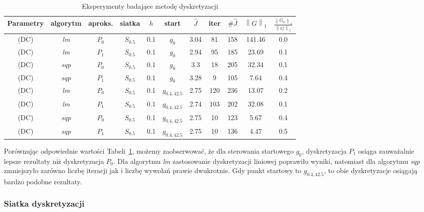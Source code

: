\documentclass[11pt]{article}
\newcommand{\norm}[1]{\left\lVert#1\right\rVert}
\begin{document}
\begin{table}[h!]
  \begin{center}
    \begin{tabular}{|c|c|c|c|c|c|c|c|c|c|c|}
      \hline
      Parametry & algorytm & aproks. & siatka & $h$ & start & $\hat{J}$ & iter & $\#\hat{J}$ & $\norm{G}_1$ & $\frac{\norm{G_0}_1}{\norm{G}_1}$ \\
      \hline
      (DC) & {\it lm\/} & $P_0$ & $S_{0.5}$ & 0.1 & $g_0$ & 3.04 & 81 & 158 & 141.46 & 0.0 \\
      \hline
      (DC) & {\it lm\/} & $P_1$ & $S_{0.5}$ & 0.1 & $g_0$ & 2.94 & 95 & 185 & 23.69 & 0.1 \\
      \hline
      (DC) & {\it sqp\/} & $P_0$ & $S_{0.5}$ & 0.1 & $g_0$ & 3.3 & 18 & 205 & 32.34 & 0.1 \\
      \hline
      (DC) & {\it sqp\/} & $P_1$ & $S_{0.5}$ & 0.1 & $g_0$ & 3.28 & 9 & 105 & 7.64 & 0.4 \\
      \hline
      (DC) & {\it lm\/} & $P_0$ & $S_{0.5}$ & 0.1 & $g_{0.4,42.5}$ & 2.75 & 120 & 236 & 13.07 & 0.2 \\
      \hline
      (DC) & {\it lm\/} & $P_1$ & $S_{0.5}$ & 0.1 & $g_{0.4,42.5}$ & 2.74 & 103 & 202 & 32.08 & 0.1 \\
      \hline
      (DC) & {\it sqp\/} & $P_0$ & $S_{0.5}$ & 0.1 & $g_{0.4,42.5}$ & 2.75 & 10 & 123 & 5.67 & 0.4 \\
      \hline
      (DC) & {\it sqp\/} & $P_1$ & $S_{0.5}$ & 0.1 & $g_{0.4,42.5}$ & 2.75 & 10 & 136 & 4.47 & 0.5 \\
      \hline
    \end{tabular}
    \caption{Eksperymenty badające metodę dyskretyzacji}\label{discr_tbl}
  \end{center}
\end{table}

Porównując odpowiednie wartości Tabeli~\ref{discr_tbl}, możemy zaobserwować, że dla sterowania startowego $g_0$, dyskretyzacja $P_1$ osiąga zauważalnie lepsze rezultaty niż dyskretyzacja $P_0$. Dla algorytmu {\it lm\/} zastosowanie dyskretyzacji liniowej poprawiło wyniki, natomiast dla algorytmu {\it sqp\/} zmniejszyło zarówno liczbę iteracji jak i liczbę wywołań prawie dwukrotnie. Gdy punkt startowy to $g_{0.4,42.5}$, to obie dyskretyzacje osiągają bardzo podobne rezultaty.

\subsubsection{Siatka dyskretyzacji}
\end{document}
